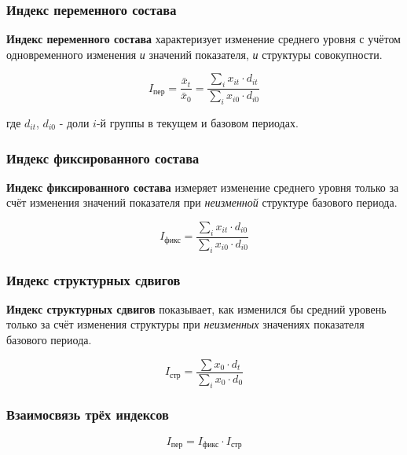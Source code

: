 \documentclass[a4paper]{article}
\begin{document}
\subsubsection{Индекс переменного состава}


	\textbf{Индекс переменного состава} характеризует изменение среднего уровня
	с учётом одновременного изменения \emph{и} значений показателя, \emph{и}
	структуры совокупности.


\begin{equation}
	I_{\text{пер}} = \frac{\bar{x}_t}{\bar{x}_0}
	= \frac{\displaystyle\sum_i x_{it} \cdot d_{it}}
	{\displaystyle\sum_i x_{i0} \cdot d_{i0}}
\end{equation}

где $d_{it}$, $d_{i0}$ - доли $i$-й группы в текущем и базовом периодах.

\subsubsection{Индекс фиксированного состава}


	\textbf{Индекс фиксированного состава} измеряет изменение среднего уровня
	только за счёт изменения значений показателя при \emph{неизменной} структуре
	базового периода.


\begin{equation}
	I_{\text{фикс}} =
	\frac{\displaystyle\sum_i x_{it} \cdot d_{i0}}
	{\displaystyle\sum_i x_{i0} \cdot d_{i0}}
\end{equation}

\subsubsection{Индекс структурных сдвигов}


	\textbf{Индекс структурных сдвигов} показывает, как изменился бы средний
	уровень только за счёт изменения структуры при \emph{неизменных} значениях
	показателя базового периода.


\begin{equation}
	I_{\text{стр}} =
	\frac{\displaystyle\sum x_{0} \cdot d_{t}}
	{\displaystyle\sum_i x_{0} \cdot d_{0}}
\end{equation}

\subsubsection{Взаимосвязь трёх индексов}

\begin{equation}
	\boxed{I_{\text{пер}} = I_{\text{фикс}} \cdot I_{\text{стр}}}
\end{equation}
\end{document}
